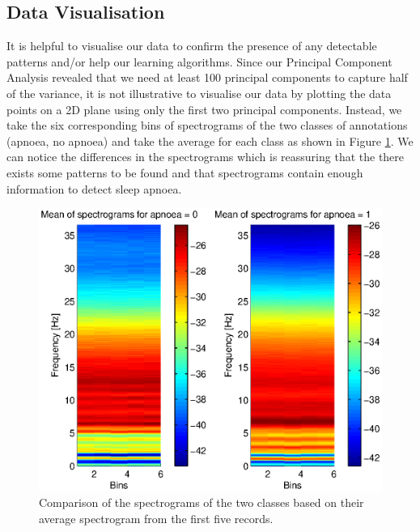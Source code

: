 \subsection{Data Visualisation}
It is helpful to visualise our data to confirm the presence of any detectable patterns and/or help our learning algorithms. Since our Principal Component Analysis revealed that we need at least 100 principal components to capture half of the variance, it is not illustrative to visualise our data by plotting the data points on a 2D plane using only the first two principal components. Instead, we take the six corresponding bins of spectrograms of the two classes of annotations (apnoea, no apnoea) and take the average for each class as shown in Figure \ref{fig:spectrogramClassesVisualise}. We can notice the differences in the spectrograms which is reassuring that the there exists some patterns to be found and that spectrograms contain enough information to detect sleep apnoea.

\begin{figure}[ht!]
	\centering
		\includegraphics{drawings/spectrogramClassesVisualise.eps}
	\caption{Comparison of the spectrograms of the two classes based on their average spectrogram from the first five records.}
	\label{fig:spectrogramClassesVisualise}
\end{figure}